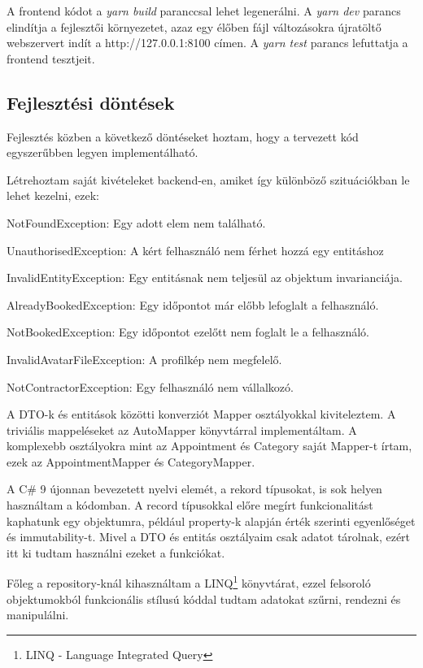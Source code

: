 A frontend kódot a \textit{yarn build} paranccsal lehet legenerálni. A \textit{yarn dev} parancs elindítja a fejlesztői környezetet, azaz egy élőben fájl változásokra újratöltő webszervert indít a http://127.0.0.1:8100 címen. A \textit{yarn test} parancs lefuttatja a frontend tesztjeit.


\subsection{Fejlesztési döntések}
Fejlesztés közben a következő döntéseket hoztam, hogy a tervezett kód egyszerűbben legyen implementálható.

Létrehoztam saját kivételeket backend-en, amiket így különböző szituációkban le lehet kezelni, ezek:

\begin{compactitem}
	\item NotFoundException: Egy adott elem nem található.
	\item UnauthorisedException: A kért felhasználó nem férhet hozzá egy entitáshoz
	\item InvalidEntityException: Egy entitásnak nem teljesül az objektum invarianciája.
	\item AlreadyBookedException: Egy időpontot már előbb lefoglalt a felhasználó.
	\item NotBookedException: Egy időpontot ezelőtt nem foglalt le a felhasználó.
	\item InvalidAvatarFileException: A profilkép nem megfelelő.
	\item NotContractorException: Egy felhasználó nem vállalkozó.
\end{compactitem}

A DTO-k és entitások közötti konverziót Mapper osztályokkal kiviteleztem. A triviális mappeléseket az AutoMapper könyvtárral implementáltam. A komplexebb osztályokra mint az Appointment és Category saját Mapper-t írtam, ezek az AppointmentMapper és CategoryMapper.

A C\# 9 újonnan bevezetett nyelvi elemét, a rekord típusokat, is sok helyen használtam a kódomban. A record típusokkal előre megírt funkcionalitást kaphatunk egy objektumra, például property-k alapján érték szerinti egyenlőséget és immutability-t. Mivel a DTO és entitás osztályaim csak adatot tárolnak, ezért itt ki tudtam használni ezeket a funkciókat.

Főleg a repository-knál kihasználtam a LINQ\footnote{LINQ - Language Integrated Query} könyvtárat, ezzel felsoroló objektumokból funkcionális stílusú kóddal tudtam adatokat szűrni, rendezni és manipulálni.

